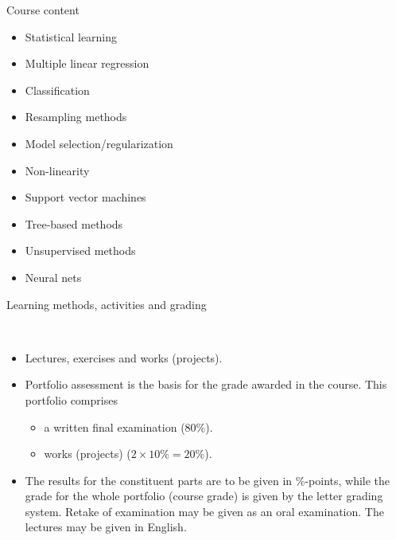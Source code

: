 \documentclass[10pt,ignorenonframetext,]{beamer}
\providecommand{\tightlist}{%
  \setlength{\itemsep}{0pt}\setlength{\parskip}{0pt}}
\begin{document}
\begin{frame}

\begin{block}{Course content}

\vspace{2mm}

\begin{itemize}
\tightlist
\item
  Statistical learning
\item
  Multiple linear regression
\item
  Classification
\item
  Resampling methods
\item
  Model selection/regularization
\item
  Non-linearity
\item
  Support vector machines
\item
  Tree-based methods
\item
  Unsupervised methods
\item
  Neural nets
\end{itemize}

\end{block}

\end{frame}

\begin{frame}

\begin{block}{Learning methods, activities and grading}

\(~\)

\begin{itemize}
\item
  Lectures, exercises and works (projects). ~
\item
  Portfolio assessment is the basis for the grade awarded in the course.
  This portfolio comprises

  \begin{itemize}
  \tightlist
  \item
    a written final examination (80\%).
  \item
    works (projects) (\(2\times 10\%=20\%\)). ~
  \end{itemize}
\item
  The results for the constituent parts are to be given in \%-points,
  while the grade for the whole portfolio (course grade) is given by the
  letter grading system. Retake of examination may be given as an oral
  examination. The lectures may be given in English.
\end{itemize}

\end{block}

\end{frame}
\end{document}
